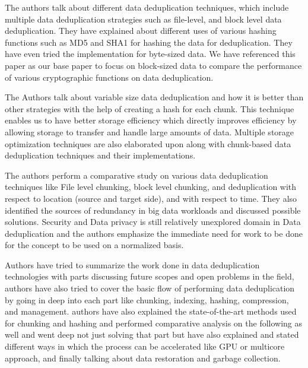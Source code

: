 \documentclass[%
 aip,
cp,  %
 amsmath,amssymb,%
 reprint,%
]{revtex4-2}
\begin{document}
The authors \cite{hlz10} talk about different data deduplication techniques, which include multiple data deduplication strategies such as file-level, and block level data deduplication. They have explained about different uses of various hashing functions such as MD5 and SHA1 for hashing the data for deduplication. They have even tried the implementation for byte-sized data. We have referenced this paper as our base paper to focus on block-sized data to compare the performance of various cryptographic functions on data deduplication.

The Authors \cite{ma14} talk about variable size data deduplication and how it is better than other strategies with the help of creating a hash for each chunk. This technique enables us to have better storage efficiency which directly improves efficiency by allowing storage to transfer and handle large amounts of data. Multiple storage optimization techniques are also elaborated upon along with chunk-based data deduplication techniques and their implementations.

The authors \cite{cb18} perform a comparative study on various data deduplication techniques like File level chunking, block level chunking, and deduplication with respect to location (source and target side), and with respect to time. They also identified the sources of redundancy in big data workloads and discussed possible solutions. Security and Data privacy is still relatively unexplored domain in Data deduplication and the authors emphasize the immediate need for work to be done for the concept to be used on a normalized basis. 

Authors \cite{xjfdshfzz16} have tried to summarize the work done in data deduplication technologies with parts discussing future scopes and open problems in the field, authors have also tried to cover the basic flow of performing data deduplication by going in deep into each part like chunking, indexing, hashing, compression, and management. authors have also explained the state-of-the-art methods used for chunking and hashing and performed comparative analysis on the following as well and went deep not just solving that part but have also explained and stated different ways in which the process can be accelerated like GPU or multicore approach, and finally talking about data restoration and garbage collection.
\end{document}
